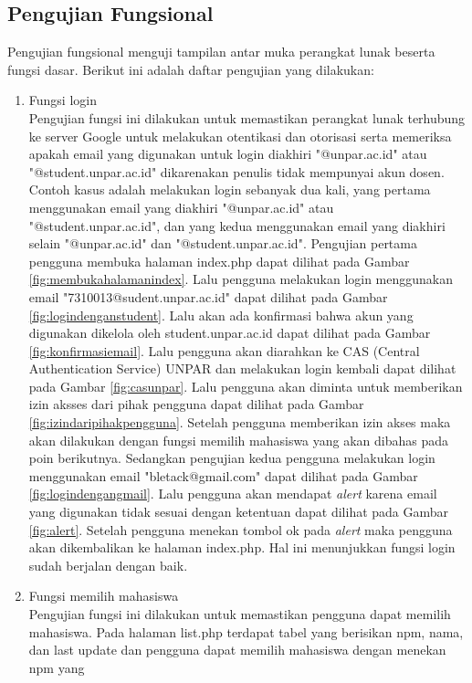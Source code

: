 \subsection{Pengujian Fungsional}
\label{sec:pengujianfungsional}
Pengujian fungsional menguji tampilan antar muka perangkat lunak beserta fungsi
dasar. Berikut ini adalah daftar pengujian yang dilakukan:
\begin{enumerate}[(1)]
\item Fungsi login\\
	Pengujian fungsi ini dilakukan untuk memastikan perangkat lunak terhubung ke
	server Google untuk melakukan otentikasi dan otorisasi serta memeriksa apakah
	email yang digunakan untuk login diakhiri "@unpar.ac.id" atau
	"@student.unpar.ac.id" dikarenakan penulis tidak mempunyai akun dosen. Contoh
	kasus adalah melakukan login sebanyak dua kali, yang pertama menggunakan email
	yang diakhiri "@unpar.ac.id" atau "@student.unpar.ac.id", dan yang kedua
	menggunakan email yang diakhiri selain "@unpar.ac.id" dan
	"@student.unpar.ac.id". Pengujian pertama pengguna membuka halaman index.php
	dapat dilihat pada Gambar \ref{fig:membukahalamanindex}. Lalu pengguna melakukan
	login menggunakan email "7310013@sudent.unpar.ac.id" dapat dilihat pada Gambar
	\ref{fig:logindenganstudent}. Lalu akan ada konfirmasi bahwa akun yang digunakan
	dikelola oleh student.unpar.ac.id dapat dilihat pada Gambar
	\ref{fig:konfirmasiemail}. Lalu pengguna akan diarahkan ke CAS (Central
	Authentication Service) UNPAR dan melakukan login kembali dapat dilihat pada
	Gambar \ref{fig:casunpar}. Lalu pengguna akan diminta untuk memberikan izin
	aksses dari pihak pengguna dapat dilihat pada Gambar
	\ref{fig:izindaripihakpengguna}. Setelah pengguna memberikan izin akses maka
	akan dilakukan dengan fungsi memilih mahasiswa yang akan dibahas pada poin
	berikutnya. Sedangkan pengujian kedua pengguna melakukan login menggunakan
	email "bletack@gmail.com" dapat dilihat pada Gambar \ref{fig:logindengangmail}.
	Lalu pengguna akan mendapat {\it alert} karena email yang digunakan tidak
	sesuai dengan ketentuan dapat dilihat pada Gambar \ref{fig:alert}. Setelah
	pengguna menekan tombol ok pada {\it alert} maka pengguna akan dikembalikan ke
	halaman index.php. Hal ini menunjukkan fungsi login sudah berjalan dengan baik.
\item Fungsi memilih mahasiswa\\
	Pengujian fungsi ini dilakukan untuk memastikan pengguna dapat memilih
	mahasiswa. Pada halaman list.php terdapat tabel yang berisikan npm, nama, dan
	last update dan pengguna dapat memilih mahasiswa dengan menekan npm yang

\end{enumerate}
